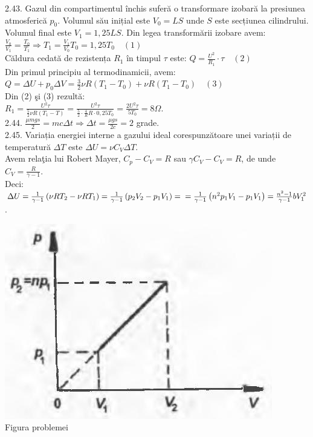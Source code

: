 2.43. Gazul din compartimentul închis suferă o transformare izobară la presiunea atmosferică $p_{0}$. Volumul său inițial este $V_{0}=L S$ unde $S$ este secțiunea cilindrului. Volumul final este $V_{1}=1,25 L S$. Din legea transformării izobare avem:\\ $\frac{V_{0}}{V_{1}}=\frac{T_{0}}{T_{1}} \Rightarrow T_{1}=\frac{V_{1}}{V_{0}} T_{0}=1,25 T_{0} \quad (1)$\\ Căldura cedată de rezistența $R_{1}$ în timpul $\tau$ este: $Q=\frac{U^{2}}{R_{1}} \cdot \tau \quad (2)$\\ Din primul principiu al termodinamicii, avem:\\ $Q=\Delta U+p_{0} \Delta V=\frac{3}{2} \nu R\left(T_{1}-T_{0}\right)+\nu R\left(T_{1}-T_{0}\right) \quad (3)$\\ Din (2) şi (3) rezultă:\\ $R_{1}=\frac{U^{2} \tau}{\frac{5}{2} \nu R\left(T_{1}-T\right)}=\frac{U^{2} \tau}{\frac{5}{2} \cdot \frac{4}{R} R \cdot 0,25 T_{0}}=\frac{2 U^{2} \tau}{5 T_{0}}=8 \Omega$.\\

2.44. $\frac{\mu m g s}{2}=m c \Delta t \Rightarrow \Delta t=\frac{\mu g s}{2 c}=2$ grade.\\

2.45. Variația energiei interne a gazului ideal corespunzătoare unei variații de temperatură $\Delta T$ este $\Delta U=\nu C_{V} \Delta T$.\\ Avem relaţia lui Robert Mayer, $C_{p}-C_{V}=R$ sau $\gamma C_{V}-C_{V}=R$, de unde $C_{V}=\frac{R}{\gamma-1}$.\\ Deci: $\Delta U=\frac{1}{\gamma-1}\left(\nu R T_{2}-\nu R T_{1}\right)=\frac{1}{\gamma-1}\left(p_{2} V_{2}-p_{1} V_{1}\right)= \\ =\frac{1}{\gamma-1}\left(n^{2} p_{1} V_{1}-p_{1} V_{1}\right)=\frac{n^{2}-1}{\gamma-1} b V_{1}^{2}$.\\ \begin{center} \includegraphics[width=0.4\linewidth]{images/2025_07_01_5b3ff9fa0d508c8e9f17g-279}\\ Figura problemei \end{center}\\

